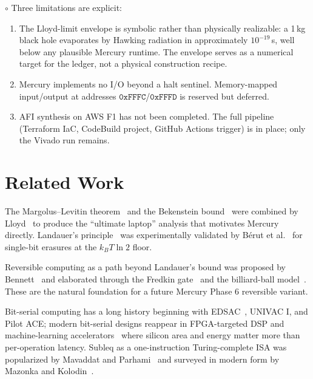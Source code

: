 \documentclass[conference,letterpaper,10pt]{IEEEtran}
\newcommand{\Speculative}{\textbf{\textcolor[rgb]{0.7,0.0,0.0}{$\circ$}}}
\begin{document}
\Speculative{} Three limitations are explicit:
\begin{enumerate}
    \item The Lloyd-limit envelope is symbolic rather than
        physically realizable: a 1\,kg black hole evaporates by
        Hawking radiation in approximately $10^{-19}$\,s, well
        below any plausible Mercury runtime. The envelope serves
        as a numerical target for the ledger, not a physical
        construction recipe.
    \item Mercury implements no I/O beyond a halt sentinel.
        Memory-mapped input/output at addresses
        $\mathtt{0xFFFC}$/$\mathtt{0xFFFD}$ is reserved but
        deferred.
    \item AFI synthesis on AWS F1 has not been completed.
        The full pipeline (Terraform IaC, CodeBuild project,
        GitHub Actions trigger) is in place; only the Vivado
        run remains.
\end{enumerate}

\section{Related Work}

The Margolus--Levitin theorem~\cite{margolus1998} and the
Bekenstein bound~\cite{bekenstein1973,bekenstein1981} were
combined by Lloyd~\cite{lloyd2000} to produce the ``ultimate
laptop'' analysis that motivates Mercury directly. Landauer's
principle~\cite{landauer1961} was experimentally validated by
B{\'e}rut et al.~\cite{berut2012} for single-bit erasures at
the $k_B T \ln 2$ floor.

Reversible computing as a path beyond Landauer's bound was
proposed by Bennett~\cite{bennett1973} and elaborated through
the Fredkin gate~\cite{fredkin1982} and the billiard-ball
model~\cite{toffoli1980}. These are the natural foundation for
a future Mercury Phase 6 reversible variant.

Bit-serial computing has a long history beginning with
EDSAC~\cite{wilkes1956}, UNIVAC I, and Pilot ACE; modern
bit-serial designs reappear in FPGA-targeted DSP and machine-learning
accelerators~\cite{judd2016} where silicon area and energy
matter more than per-operation latency. Subleq as a
one-instruction Turing-complete ISA was popularized by
Mavaddat and Parhami~\cite{mavaddat1988} and surveyed in
modern form by Mazonka and Kolodin~\cite{mazonka2011}.
\end{document}
